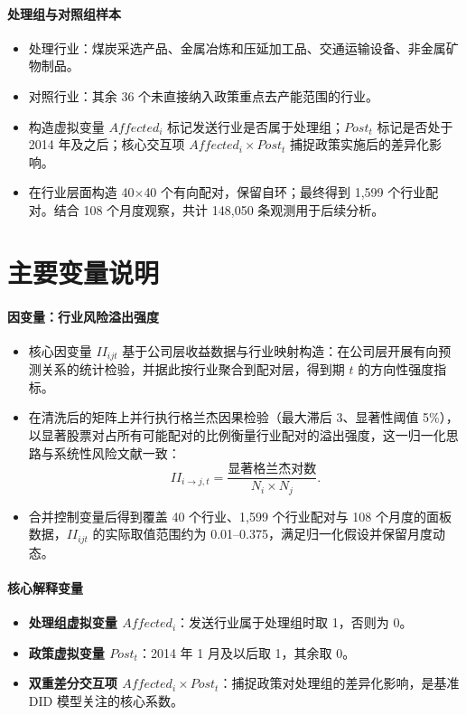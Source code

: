 \paragraph{处理组与对照组样本}
\begin{itemize}
    \item 处理行业：煤炭采选产品、金属冶炼和压延加工品、交通运输设备、非金属矿物制品。
    \item 对照行业：其余 36 个未直接纳入政策重点去产能范围的行业。
    \item 构造虚拟变量 \(Affected_i\) 标记发送行业是否属于处理组；\(Post_t\) 标记是否处于 2014 年及之后；核心交互项 \(Affected_i \times Post_t\) 捕捉政策实施后的差异化影响。
    \item 在行业层面构造 40\(\times\)40 个有向配对，保留自环；最终得到 1,599 个行业配对。结合 108 个月度观察，共计 148{,}050 条观测用于后续分析。
\end{itemize}

\section{主要变量说明}
\label{sec:variable_definition}

\paragraph{因变量：行业风险溢出强度}
\begin{itemize}
    \item 核心因变量 \(II_{ijt}\) 基于公司层收益数据与行业映射构造：在公司层开展有向预测关系的统计检验，并据此按行业聚合到配对层，得到期 \(t\) 的方向性强度指标。
    \item 在清洗后的矩阵上并行执行格兰杰因果检验（最大滞后 3、显著性阈值 5\%），以显著股票对占所有可能配对的比例衡量行业配对的溢出强度，这一归一化思路与系统性风险文献一致\citep{billio2012econometric,diebold2012better,diebold2014connectedness}：
    \begin{equation}
        II_{i\rightarrow j,t} = \frac{\text{显著格兰杰对数}}{N_i \times N_j}.
    \end{equation}
    \item 合并控制变量后得到覆盖 40 个行业、1,599 个行业配对与 108 个月度的面板数据，\(II_{ijt}\) 的实际取值范围约为 0.01--0.375，满足归一化假设并保留月度动态。

\end{itemize}

\paragraph{核心解释变量}
\begin{itemize}
    \item \textbf{处理组虚拟变量 \(Affected_i\)}：发送行业属于处理组时取 1，否则为 0。
    \item \textbf{政策虚拟变量 \(Post_t\)}：2014 年 1 月及以后取 1，其余取 0。
    \item \textbf{双重差分交互项 \(Affected_i \times Post_t\)}：捕捉政策对处理组的差异化影响，是基准 DID 模型关注的核心系数。
\end{itemize}

